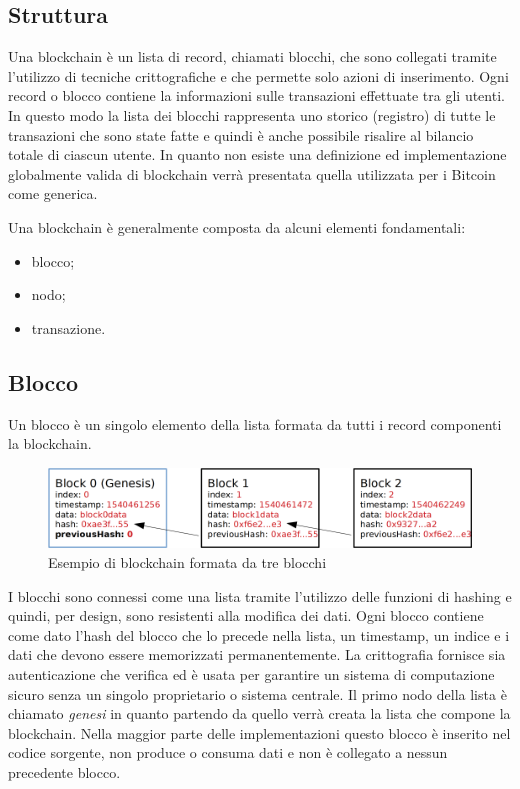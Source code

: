 \begin{enumerate}[1.]
\section{Struttura}
Una blockchain è un lista di record, chiamati blocchi, che sono collegati tramite l'utilizzo di tecniche crittografiche e che permette solo azioni di inserimento. Ogni record o blocco contiene la informazioni sulle transazioni effettuate tra gli utenti.
In questo modo la lista dei blocchi rappresenta uno storico (registro) di tutte le transazioni che sono state fatte e quindi è anche possibile risalire al bilancio totale di ciascun utente.
In quanto non esiste una definizione ed implementazione globalmente valida di blockchain verrà presentata quella utilizzata per i Bitcoin come generica.

Una blockchain è generalmente composta da alcuni elementi fondamentali:
\begin{itemize}
    \item blocco;
    \item nodo;
    \item transazione.
\end{itemize}

\subsection{Blocco}
Un blocco è un singolo elemento della lista formata da tutti i record componenti la blockchain.
\begin{figure}[H]
    \centering
    \includegraphics[width=\textwidth]{images/blockchain_basic.png}
    \caption{Esempio di blockchain formata da tre blocchi}
\end{figure}
I blocchi sono connessi come una lista tramite l'utilizzo delle funzioni di hashing e quindi, per design, sono resistenti alla modifica dei dati.
Ogni blocco contiene come dato l'hash del blocco che lo precede nella lista, un timestamp, un indice e i dati che devono essere memorizzati permanentemente.\newline
La crittografia fornisce sia autenticazione che verifica ed è usata per garantire un sistema di computazione sicuro senza un singolo proprietario o sistema centrale.\newline
Il primo nodo della lista è chiamato \textit{genesi} in quanto partendo da quello verrà creata la lista che compone la blockchain. Nella maggior parte delle implementazioni questo blocco è inserito nel codice sorgente, non produce o consuma dati e non è collegato a nessun precedente blocco.


\end{enumerate}
